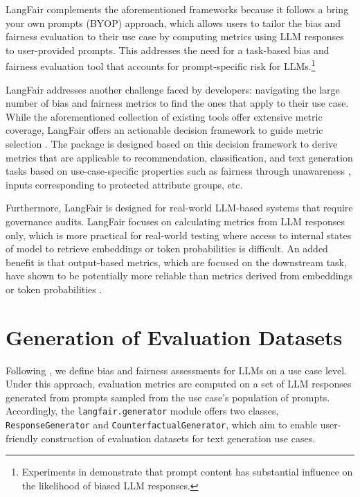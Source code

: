 \documentclass[
]{article}
\begin{document}
LangFair complements the aforementioned frameworks because it follows a bring your own prompts (BYOP) approach, which allows users to tailor the bias and fairness evaluation to their use case by computing metrics using LLM responses to user-provided prompts. This addresses the need for a task-based bias and fairness evaluation tool that accounts for prompt-specific risk for LLMs.\footnote{Experiments in \cite{wang2023decodingtrust} demonstrate that prompt content has substantial influence on the likelihood of biased LLM responses.}


LangFair addresses another challenge faced by developers: navigating the large number of bias and fairness metrics to find the ones that apply to their use case. While the aforementioned collection of existing tools offer extensive metric coverage, LangFair offers an actionable decision framework to guide metric selection \cite{bouchard2024actionableframeworkassessingbias}. The package is designed based on this decision framework to derive metrics that are applicable to recommendation, classification, and text generation tasks based on use-case-specific properties such as fairness through unawareness \cite{gallegos2024biasfairnesslargelanguage}, inputs corresponding to protected attribute groups, etc. 

Furthermore, LangFair is designed for real-world LLM-based systems that require governance audits. LangFair focuses on calculating metrics from LLM responses only, which is more practical for real-world testing where access to internal states of model to retrieve embeddings or token probabilities is difficult. An added benefit is that output-based metrics, which are focused on the downstream task, have shown to be potentially more reliable than metrics derived from embeddings or token probabilities \cite{intrinsic_do_not, biased_rulers}.




\section{Generation of Evaluation Datasets}
Following \cite{bouchard2024actionableframeworkassessingbias}, we define bias and fairness assessments for LLMs on a use case level. Under this approach, evaluation metrics are computed on a set of LLM responses generated from prompts sampled from the use case's population of prompts. Accordingly, the \texttt{langfair.generator} module offers two classes, \texttt{ResponseGenerator} and \texttt{CounterfactualGenerator}, which aim to enable user-friendly construction of evaluation datasets for text generation use cases.
\end{document}
